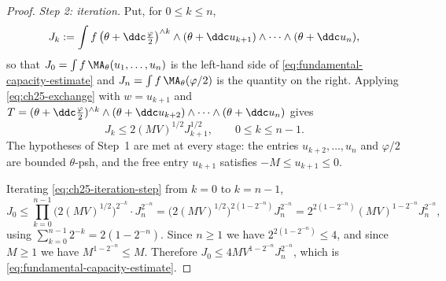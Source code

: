 \begin{proof}
\emph{Step 2: iteration.}  Put, for \(0\leq k\leq n\),
\[
 J_k:=\int f\,
  \bigl(\theta+\ddc\tfrac\varphi2\bigr)^{\wedge k}
  \wedge(\theta+\ddc u_{k+1})\wedge\cdots\wedge(\theta+\ddc u_n),
\]
so that \(J_0=\int f\,\MA_\theta(u_1,\ldots,u_n)\) is the left-hand side of
\eqref{eq:fundamental-capacity-estimate} and
\(J_n=\int f\,\MA_\theta(\varphi/2)\) is the quantity on the right.  Applying
\eqref{eq:ch25-exchange} with \(w=u_{k+1}\) and
\(T=(\theta+\ddc\frac\varphi2)^{\wedge k}\wedge(\theta+\ddc u_{k+2})
\wedge\cdots\wedge(\theta+\ddc u_n)\) gives
\begin{equation}
\label{eq:ch25-iteration-step}
 J_k\leq2(MV)^{1/2}J_{k+1}^{1/2},\qquad 0\leq k\leq n-1 .
\end{equation}
The hypotheses of Step~1 are met at every stage: the entries
\(u_{k+2},\ldots,u_n\) and \(\varphi/2\) are bounded \(\theta\)-psh, and the
free entry \(u_{k+1}\) satisfies \(-M\leq u_{k+1}\leq0\).

Iterating \eqref{eq:ch25-iteration-step} from \(k=0\) to \(k=n-1\),
\[
 J_0\leq\prod_{k=0}^{n-1}\bigl(2(MV)^{1/2}\bigr)^{2^{-k}}\cdot
 J_n^{2^{-n}}
 =\bigl(2(MV)^{1/2}\bigr)^{2(1-2^{-n})}J_n^{2^{-n}}
 =2^{2(1-2^{-n})}(MV)^{1-2^{-n}}J_n^{2^{-n}},
\]
using \(\sum_{k=0}^{n-1}2^{-k}=2(1-2^{-n})\).  Since \(n\geq1\) we have
\(2^{2(1-2^{-n})}\leq4\), and since \(M\geq1\) we have
\(M^{1-2^{-n}}\leq M\).  Therefore
\(J_0\leq4MV^{1-2^{-n}}J_n^{2^{-n}}\), which is
\eqref{eq:fundamental-capacity-estimate}.
\end{proof}

